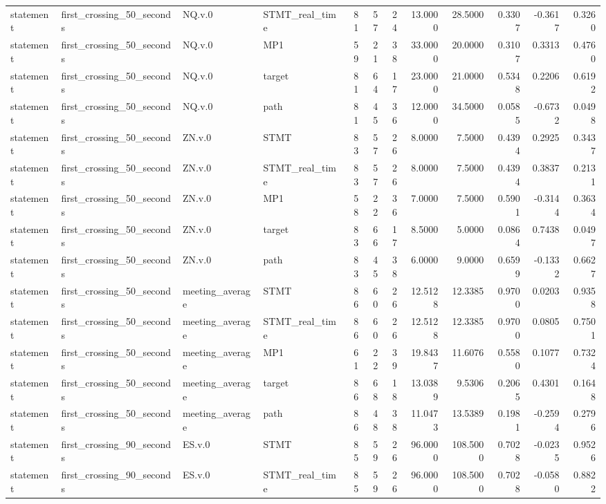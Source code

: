 \begin{tabular}{llllrrrrrrrr}
statement & first_crossing_50_seconds & NQ.v.0 & STMT_real_time & 81 & 57 & 24 & 13.0000 & 28.5000 & 0.3307 & -0.3617 & 0.3260 \\
statement & first_crossing_50_seconds & NQ.v.0 & MP1 & 59 & 21 & 38 & 33.0000 & 20.0000 & 0.3107 & 0.3313 & 0.4760 \\
statement & first_crossing_50_seconds & NQ.v.0 & target & 81 & 64 & 17 & 23.0000 & 21.0000 & 0.5348 & 0.2206 & 0.6192 \\
statement & first_crossing_50_seconds & NQ.v.0 & path & 81 & 45 & 36 & 12.0000 & 34.5000 & 0.0585 & -0.6732 & 0.0498 \\
statement & first_crossing_50_seconds & ZN.v.0 & STMT & 83 & 57 & 26 & 8.0000 & 7.5000 & 0.4394 & 0.2925 & 0.3437 \\
statement & first_crossing_50_seconds & ZN.v.0 & STMT_real_time & 83 & 57 & 26 & 8.0000 & 7.5000 & 0.4394 & 0.3837 & 0.2131 \\
statement & first_crossing_50_seconds & ZN.v.0 & MP1 & 58 & 22 & 36 & 7.0000 & 7.5000 & 0.5901 & -0.3144 & 0.3634 \\
statement & first_crossing_50_seconds & ZN.v.0 & target & 83 & 66 & 17 & 8.5000 & 5.0000 & 0.0864 & 0.7438 & 0.0497 \\
statement & first_crossing_50_seconds & ZN.v.0 & path & 83 & 45 & 38 & 6.0000 & 9.0000 & 0.6599 & -0.1332 & 0.6627 \\
statement & first_crossing_50_seconds & meeting_average & STMT & 86 & 60 & 26 & 12.5128 & 12.3385 & 0.9700 & 0.0203 & 0.9358 \\
statement & first_crossing_50_seconds & meeting_average & STMT_real_time & 86 & 60 & 26 & 12.5128 & 12.3385 & 0.9700 & 0.0805 & 0.7501 \\
statement & first_crossing_50_seconds & meeting_average & MP1 & 61 & 22 & 39 & 19.8437 & 11.6076 & 0.5580 & 0.1077 & 0.7324 \\
statement & first_crossing_50_seconds & meeting_average & target & 86 & 68 & 18 & 13.0389 & 9.5306 & 0.2065 & 0.4301 & 0.1648 \\
statement & first_crossing_50_seconds & meeting_average & path & 86 & 48 & 38 & 11.0473 & 13.5389 & 0.1981 & -0.2594 & 0.2796 \\
statement & first_crossing_90_seconds & ES.v.0 & STMT & 85 & 59 & 26 & 96.0000 & 108.5000 & 0.7028 & -0.0235 & 0.9526 \\
statement & first_crossing_90_seconds & ES.v.0 & STMT_real_time & 85 & 59 & 26 & 96.0000 & 108.5000 & 0.7028 & -0.0580 & 0.8822 \\

\end{tabular}
